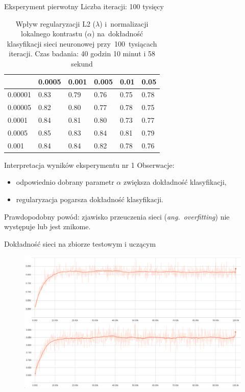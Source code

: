 \documentclass[xcolor=dvipsnames]{beamer}
\begin{document}
\begin{frame}{Eksperyment pierwotny}
Liczba iteracji: 100 tysięcy
\begin{table}[H]
    \centering
    \begin{tabular}{|l|l|l|l|l|l|}
      \hline
      \backslashbox{$\alpha$}{$\lambda$} & \cellcolor{orange!25}0.0005 & 0.001 & 0.005 & 0.01 & 0.05 \\
      \hline
      0.00001 & 0.83 & 0.79 & 0.76 & 0.75 & 0.78 \\
      \hline
      0.00005 & 0.82 & 0.80 & 0.77 & 0.78 & 0.75 \\
      \hline
      0.0001  & 0.84 & 0.81 & 0.80 & 0.73 & 0.77 \\
      \hline
      \cellcolor{orange!25}0.0005  & 0.85 & 0.83 & 0.84 & 0.81 & 0.79 \\
      \hline
      0.001   & 0.84 & 0.84 & 0.82 & 0.78 & 0.76 \\
      \hline
    \end{tabular}
    \caption{Wpływ regularyzacji L2 ($\lambda$) i~normalizacji lokalnego kontrastu ($\alpha$) na~dokładność klasyfikacji
    sieci neuronowej przy~100~tysiącach iteracji. Czas badania: 40 godzin 10 minut i 58 sekund}
    \label{table:wyniki1}
\end{table}
\end{frame}
\begin{frame}{Interpretacja wyników eksperymentu nr 1}
    Obserwacje:
    \begin{itemize}
        \item odpowiednio dobrany parametr $\alpha$ zwiększa dokładność klasyfikacji,
        \item regularyzacja pogarsza dokładność klasyfikacji.
    \end{itemize}
    \vspace{5mm}
    Prawdopodobny powód: zjawisko przeuczenia sieci (\textit{ang.~overfitting}) nie występuje lub jest znikome.
\end{frame}
\begin{frame}{Dokładność sieci na zbiorze testowym i uczącym}
  \begin{figure}
    \includegraphics[width=\textwidth]{img/badanie_1.png}
  \end{figure}
\end{frame}
\end{document}
